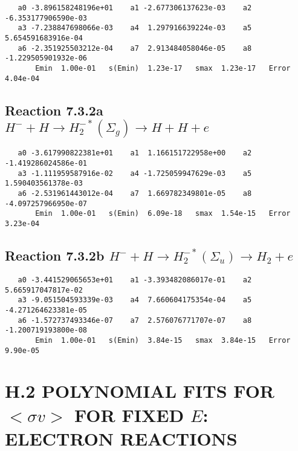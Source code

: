 \documentclass[12pt]{article}
\begin{document}
\begin{small}\begin{verbatim}
   a0 -3.896158248196e+01    a1 -2.677306137623e-03    a2 -6.353177906590e-03
   a3 -7.238847698066e-03    a4  1.297916639224e-03    a5  5.654591683916e-04
   a6 -2.351925503212e-04    a7  2.913484058046e-05    a8 -1.229505901932e-06
       Emin  1.00e-01   s(Emin)  1.23e-17   smax  1.23e-17   Error  4.04e-04
\end{verbatim}\end{small}

\newpage
\subsection{
Reaction 7.3.2a $   H^- + H \rightarrow H_2^{-*}(\Sigma_g) \rightarrow H + H + e$}


\begin{small}\begin{verbatim}
   a0 -3.617990822381e+01    a1  1.166151722958e+00    a2 -1.419286024586e-01
   a3 -1.111959587916e-02    a4 -1.725059947629e-03    a5  1.590403561378e-03
   a6 -2.531961443012e-04    a7  1.669782349801e-05    a8 -4.097257966950e-07
       Emin  1.00e-01   s(Emin)  6.09e-18   smax  1.54e-15   Error  3.23e-04
\end{verbatim}\end{small}

\newpage
\subsection{
Reaction 7.3.2b $   H^- + H \rightarrow H_2^{-*}(\Sigma_u) \rightarrow H_2 + e$}


\begin{small}\begin{verbatim}
   a0 -3.441529065653e+01    a1 -3.393482086017e-01    a2  5.665917047817e-02
   a3 -9.051504593339e-03    a4  7.660604175354e-04    a5 -4.271264623381e-05
   a6 -1.572737493346e-07    a7  2.576076771707e-07    a8 -1.200719193800e-08
       Emin  1.00e-01   s(Emin)  3.84e-15   smax  3.84e-15   Error  9.90e-05
\end{verbatim}\end{small}






\newpage
\section{
H.2  POLYNOMIAL FITS FOR $<\sigma v>$ FOR FIXED $E$:  ELECTRON REACTIONS}
\end{document}
